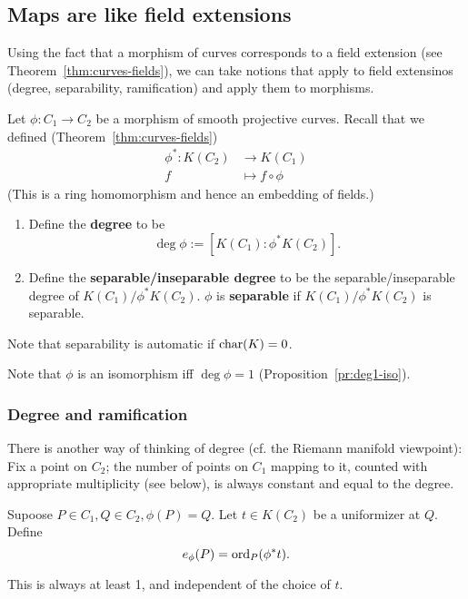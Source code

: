 \subsection{Maps are like field extensions}
Using the fact that a morphism of curves corresponds to a field extension (see Theorem~\ref{thm:curves-fields}), we can take notions that apply to field extensinos (degree, separability, ramification) and apply them to morphisms.
\begin{df}
Let $\phi:C_1\to C_2$ be a morphism of smooth projective curves. Recall that we defined (Theorem~\ref{thm:curves-fields})
\begin{align*}
\phi^*: K(C_2)&\to K(C_1)\\
f&\mapsto f\circ \phi
\end{align*}
(This is a ring homomorphism and hence an embedding of fields.)
\begin{enumerate}
\item
Define the \textbf{degree} to be 
\[\deg \phi:=[K(C_1):\phi^*K(C_2)].\]
\item
Define the \textbf{separable/inseparable degree} to be the separable/inseparable degree of $K(C_1)/\phi^*K(C_2)$.
$\phi$ is \textbf{separable} if $K(C_1)/\phi^*K(C_2)$ is separable.
\end{enumerate}
\end{df}
Note that separability is automatic if $\operatorname{char}(K)=0$.

Note that $\phi$ is an isomorphism iff $\deg\phi=1$ (Proposition~\ref{pr:deg1-iso}). 

\subsubsection{Degree and ramification}
There is another way of thinking of degree (cf. the Riemann manifold viewpoint): Fix a point on $C_2$; the number of points on $C_1$ mapping to it, counted with appropriate multiplicity (see below), is always constant and equal to the degree.
\begin{df}
Supoose $P\in C_1,Q\in C_2,\phi(P)=Q$. Let $t\in K(C_2)$ be a uniformizer at $Q$. Define
\[
e_{\phi}(P)=\operatorname{ord}_P(\phi^* t).
\]
\end{df}
This is always at least 1, and independent of the choice of $t$. 


